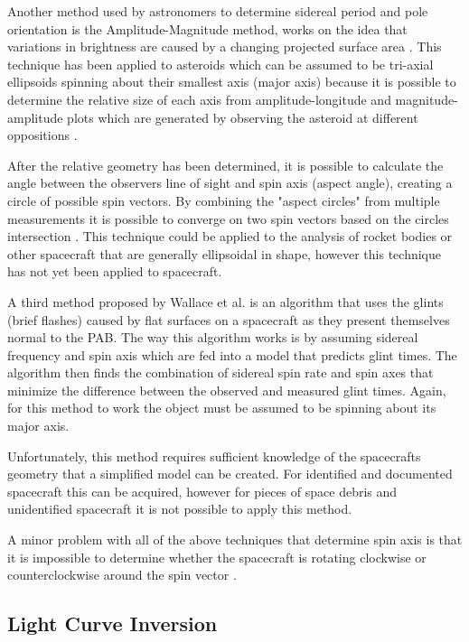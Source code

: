 \documentclass{article}
\begin{document}
Another method used by astronomers to determine sidereal period and pole orientation is the Amplitude-Magnitude method, works on the idea that variations in brightness are caused by a changing projected surface area \cite{Magnusson1989DeterminationOP}. This technique has been applied to asteroids which can be assumed to be tri-axial ellipsoids spinning about their smallest axis (major axis) because it is possible to determine the relative size of each axis from amplitude-longitude and magnitude-amplitude plots which are generated by observing the asteroid at different oppositions \cite{Magnusson1989DeterminationOP}. 

After the relative geometry has been determined, it is possible to calculate the angle between the observers line of sight and spin axis (aspect angle), creating a circle of possible spin vectors. By combining the "aspect circles" from multiple measurements it is possible to converge on two spin vectors based on the circles intersection \cite{Magnusson1989DeterminationOP}. This technique could be applied to the analysis of rocket bodies or other spacecraft that are generally ellipsoidal in shape, however this technique has not yet been applied to spacecraft.



A third method proposed by Wallace et al. \cite{Wallace} is an algorithm that uses the glints (brief flashes) caused by flat surfaces on a spacecraft as they present themselves normal to the PAB. The way this algorithm works is by assuming sidereal frequency and spin axis which are fed into a model that predicts glint times. The algorithm then finds the combination of sidereal spin rate and spin axes that minimize the difference between the observed and measured glint times. Again, for this method to work the object must be assumed to be spinning about its major axis.

Unfortunately, this method requires sufficient knowledge of the spacecrafts geometry that a simplified model can be created. For identified and documented spacecraft this can be acquired, however for pieces of space debris and unidentified spacecraft it is not possible to apply this method.

A minor problem with all of the above techniques that determine spin axis is that it is impossible to determine whether the spacecraft is rotating clockwise or counterclockwise around the spin vector \cite{Magnusson1989DeterminationOP}.

\subsection{Light Curve Inversion}
\end{document}
